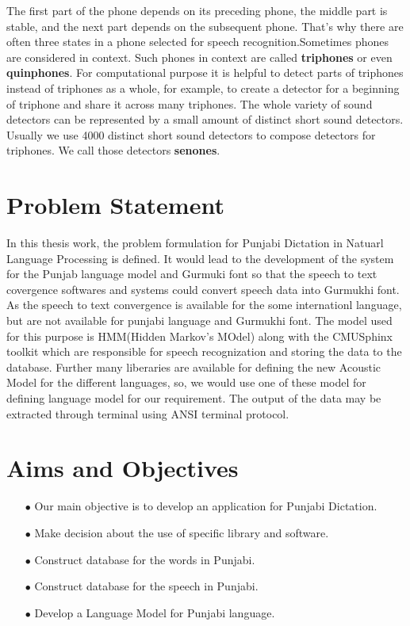 \documentclass[12pt,a4paper,oldfontcommands]{memoir}
\begin{document}
The first part of the phone depends on its preceding phone, the middle part is stable, and the next part depends on the subsequent phone. That's why there are often three states in a phone selected for speech recognition.Sometimes phones are considered in context. Such phones in context are called \textbf{triphones} or even \textbf{quinphones}. For computational purpose it is helpful to detect parts of triphones instead of triphones as a whole, for example, to create a detector for a beginning of triphone and share it across many triphones. The whole variety of sound detectors can be represented by a small amount of distinct short sound detectors. Usually we use 4000 distinct short sound detectors to compose detectors for triphones. We call those detectors \textbf{senones}. 

\section{ Problem Statement}

In this thesis work, the problem formulation for Punjabi Dictation in Natuarl Language Processing is defined. It would lead to the development of the system for the Punjab language model and Gurmuki font so that the speech to text covergence softwares and systems could convert speech data into Gurmukhi font. As the speech to text convergence is available for the some internationl language, but are not available for punjabi language and Gurmukhi font. The model used for this purpose is HMM(Hidden Markov’s MOdel) along with the CMUSphinx toolkit which are responsible for speech recognization and storing the data to the database. Further many liberaries are available for defining the new Acoustic Model for the different languages, so, we would use one of these model for defining language model for our requirement. The output of the data may be extracted through terminal using ANSI terminal protocol.

\section{Aims and Objectives}

\begin{itemize}
  \item[$\bullet$] Our main objective is to develop an application for Punjabi Dictation.
  \item[$\bullet$] Make decision about the use of specific library and software.
  \item[$\bullet$] Construct database for the words in Punjabi. 
  \item[$\bullet$] Construct database for the speech in Punjabi. 
  \item[$\bullet$] Develop a Language Model for Punjabi language.	
\end{itemize}
\end{document}
